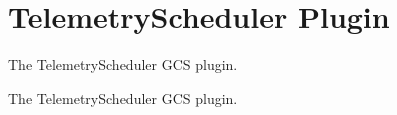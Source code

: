 \hypertarget{group___telemetry_scheduler_plugin}{\section{\-Telemetry\-Scheduler \-Plugin}
\label{group___telemetry_scheduler_plugin}
}


\-The \-Telemetry\-Scheduler \-G\-C\-S plugin.  


\-The \-Telemetry\-Scheduler \-G\-C\-S plugin. 